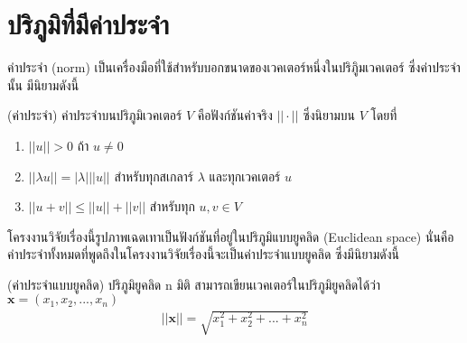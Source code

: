 \section{ปริภูมิที่มีค่าประจำ}

\hspace{1cm} ค่าประจำ (norm) เป็นเครื่องมือที่ใช้สำหรับบอกขนาดของเวคเตอร์หนึ่งในปริภูิมเวคเตอร์ ซึ่งค่าประจำนั้น มีนิยามดังนี้

\begin{Definition}
    (ค่าประจำ)  ค่าประจำบนปริภูมิเวคเตอร์ $V$ คือฟังก์ชันค่าจริง $ || \cdot ||$ ซึ่งนิยามบน $V$ โดยที่ 
    \begin{enumerate}
        \item $ ||u|| > 0 $ ถ้า $ u \neq 0 $
        \item $|| \lambda u || = | \lambda | || u || $ สำหรับทุกสเกลาร์ $\lambda$ และทุกเวคเตอร์ $u$
        \item $ ||u+v|| \leq ||u|| + ||v || $ สำหรับทุก $u,v \in V$
    \end{enumerate}
\end{Definition}

\hspace{1cm} โครงงานวิจัยเรื่องนี้รูปภาพเฉดเทาเป็นฟังก์ชันที่อยู่ในปริภูมิแบบยูคลิด (Euclidean space) นั่นคือค่าประจำทั้งหมดที่พูดถึงในโครงงานวิจัยเรื่องนี้จะเป็นค่าประจำแบบยูคลิด ซึ่งมีนิยามดังนี้

\begin{Definition} (ค่าประจำแบบยูคลิด)
    ปริภูมิยูคลิด n มิติ สามารถเขียนเวคเตอร์ในปริภูมิยูคลิดได้ว่า $ \boldsymbol{x} = (x_1,x_2, ... , x_n)$
    \begin{align*}
        || \boldsymbol{x} || = \sqrt{x_1^2 + x_2^2 + ... + x_n^2 } 
    \end{align*}
\end{Definition}